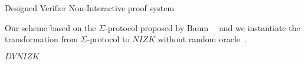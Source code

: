 % 
% 
% 
% 

\begin{section}{Designed Verifier Non-Interactive proof system}

  Our scheme based on the $\Sigma$-protocol proposed by Baum~\etal~\cite{DBLP:journals/iacr/BaumDOP16} and we instantiate the transformation from $\Sigma$-protocol to $NIZK$ without random oracle~\cite{DBLP:conf/pkc/ChaidosG15}.

  \begin{subsection}{$DVNIZK$ }

  \end{subsection}

\end{section}